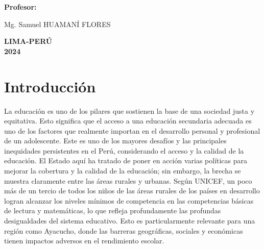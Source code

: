 \documentclass[
]{article}
\begin{document}
\begin{titlepage}
\begin{center}
\begin{large}
\end{large}

\vspace*{0.2in}
\begin{large}
\textbf{Profesor:} \\
\end{large}
\vspace*{0.01in}

\begin{large}
Mg. Samuel HUAMANÍ  FLORES\\ [0.4cm]
\end{large}


\vspace*{0.3in}
\begin{large}
\textbf{LIMA-PERÚ }\\ [0.5cm]
\textbf{2024}
\end{large}
\end{center}
\end{titlepage}

\newpage

\renewcommand{\contentsname}{Indice de Contenido}

\tableofcontents

\newpage

\section*{Introducción}\label{introducciuxf3n}

La educación es uno de los pilares que sostienen la base de una sociedad
justa y equitativa. Esto significa que el acceso a una educación
secundaria adecuada es uno de los factores que realmente importan en el
desarrollo personal y profesional de un adolescente. Este es uno de los
mayores desafíos y las principales inequidades persistentes en el Perú,
considerando el acceso y la calidad de la educación. El Estado aquí ha
tratado de poner en acción varias políticas para mejorar la cobertura y
la calidad de la educación; sin embargo, la brecha se muestra claramente
entre las áreas rurales y urbanas. Según UNICEF, un poco más de un
tercio de todos los niños de las áreas rurales de los países en
desarrollo logran alcanzar los niveles mínimos de competencia en las
competencias básicas de lectura y matemáticas, lo que refleja
profundamente las profundas desigualdades del sistema educativo. Esto es
particularmente relevante para una región como Ayacucho, donde las
barreras geográficas, sociales y económicas tienen impactos adversos en
el rendimiento escolar.
\end{document}
